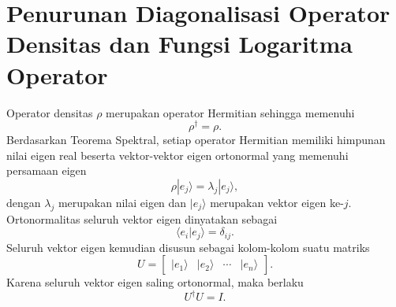\chapter{Penurunan Diagonalisasi Operator Densitas dan Fungsi Logaritma Operator}
\label{app:diagonalisasi_operator}

Operator densitas $\rho$ merupakan operator Hermitian sehingga memenuhi
\begin{equation}
    \rho^\dagger=\rho.
\end{equation}
Berdasarkan Teorema Spektral, setiap operator Hermitian memiliki himpunan nilai eigen real beserta vektor-vektor eigen ortonormal yang memenuhi persamaan eigen
\begin{equation}
    \label{eq:persamaan-eigen-operator-densitas}
    \rho |e_j\rangle
    =
    \lambda_j |e_j\rangle,
\end{equation}
dengan $\lambda_j$ merupakan nilai eigen dan $|e_j\rangle$ merupakan vektor eigen ke-$j$. Ortonormalitas seluruh vektor eigen dinyatakan sebagai
\begin{equation}
    \langle e_i|e_j\rangle
    =
    \delta_{ij}.
\end{equation}
Seluruh vektor eigen kemudian disusun sebagai kolom-kolom suatu matriks
\begin{equation}
    U=
    \begin{bmatrix}
        |e_1\rangle &
        |e_2\rangle &
        \cdots &
        |e_n\rangle
    \end{bmatrix}.
\end{equation}
Karena seluruh vektor eigen saling ortonormal, maka berlaku
\begin{equation}
    U^\dagger U
    =
    I.
\end{equation}

